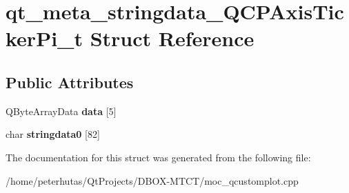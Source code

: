 \hypertarget{structqt__meta__stringdata___q_c_p_axis_ticker_pi__t}{}\section{qt\+\_\+meta\+\_\+stringdata\+\_\+\+Q\+C\+P\+Axis\+Ticker\+Pi\+\_\+t Struct Reference}
\label{structqt__meta__stringdata___q_c_p_axis_ticker_pi__t}
\subsection*{Public Attributes}
\begin{DoxyCompactItemize}
\item 
\mbox{\label{structqt__meta__stringdata___q_c_p_axis_ticker_pi__t_a9f99bf64eee1204b7290801f16f2f970}} 
Q\+Byte\+Array\+Data {\bfseries data} \mbox{[}5\mbox{]}
\item 
\mbox{\label{structqt__meta__stringdata___q_c_p_axis_ticker_pi__t_a09df8d6e526c01eb8d476aad32b2ab37}} 
char {\bfseries stringdata0} \mbox{[}82\mbox{]}
\end{DoxyCompactItemize}


The documentation for this struct was generated from the following file\+:\begin{DoxyCompactItemize}
\item 
/home/peterhutas/\+Qt\+Projects/\+D\+B\+O\+X-\/\+M\+T\+C\+T/moc\+\_\+qcustomplot.\+cpp\end{DoxyCompactItemize}
